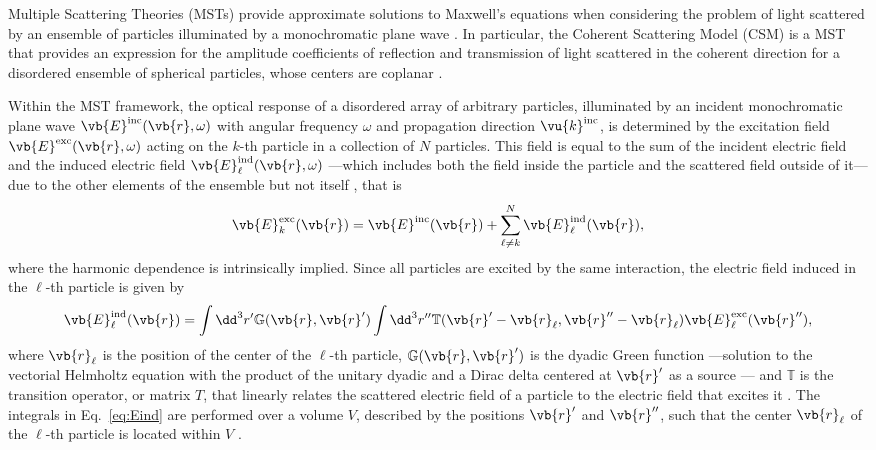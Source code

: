 
Multiple Scattering Theories (MSTs) provide approximate solutions to Maxwell's equations when considering the problem of light scattered by an ensemble of particles illuminated by a monochromatic plane wave \cite{loiko_monolayers_1998,barrera1991optical,reyes2018analytical}. In particular, the Coherent Scattering Model (CSM) is a MST that provides an expression for the amplitude coefficients of reflection and transmission of light scattered in the coherent direction for a disordered ensemble of spherical particles, whose centers are coplanar \cite{barrera_coherent_2003,garcia2012multiple,reyes2018analytical}. 

Within the MST framework, the optical response of a disordered array of arbitrary particles, illuminated by an incident monochromatic plane wave $\vb{E}^\text{inc}(\vb{r},\omega)$ with angular frequency $\omega$ and propagation direction $\vu{k}^\text{inc}$, is determined by the excitation field $\vb{E}^\text{exc}(\vb{r},\omega)$ acting on the $k$-th particle in a collection of $N$ particles. This field is equal to the sum of the incident electric field and the induced electric field $\vb{E}^\text{ind}_\ell(\vb{r},\omega)$ ---which includes both the field inside the particle and the scattered field outside of it--- due to the other elements of the ensemble but not itself \cite{garcia2012multiple,barrera_coherent_2003}, that is
%
\begin{align}
	\vb{E}^\text{exc}_k(\vb{r}) = \vb{E}^\text{inc}(\vb{r}) + \sum_{\ell\neq k}^N \vb{E}^\text{ind}_\ell(\vb{r}),
	\label{eq:Eexc}
\end{align}
%
where the harmonic dependence is intrinsically implied. Since all particles are excited by the same interaction, the electric field induced in the $\ell$-th particle is given by \cite{garcia2012multiple,barrera_coherent_2003}
%
\begin{align}
	\vb{E}^\text{ind}_\ell(\vb{r}) =
	\int\dd^3 r' \mathbb{G}(\vb{r},\vb{r}')
	\int\dd^3 r''\mathbb{T}(\vb{r}'-\vb{r}_\ell,\vb{r}''-\vb{r}_\ell) \vb{E}_\ell^\text{exc}(\vb{r}''),
	\label{eq:Eind}
\end{align}
%
where $\vb{r}_\ell$ is the position of the center of the $\ell$-th particle, $\mathbb{G}(\vb{r},\vb{r}')$ is the dyadic Green function ---solution to the vectorial Helmholtz equation with the product of the unitary dyadic and a Dirac delta centered at $\vb{r}'$ as a source \cite{tsang_scattering_2000}--- and $\mathbb{T}$ is the transition operator, or matrix $T$, that linearly relates the scattered electric field of a particle to the electric field that excites it \cite{tsang_scattering_2000}. The integrals in Eq.~\eqref{eq:Eind} are performed over a  volume $V$, described by the positions $\vb{r}'$ and $\vb{r}''$, such that the center $\vb{r}_\ell$ of the $\ell$-th particle is located within $V$ \cite{barrera_coherent_2003}.

